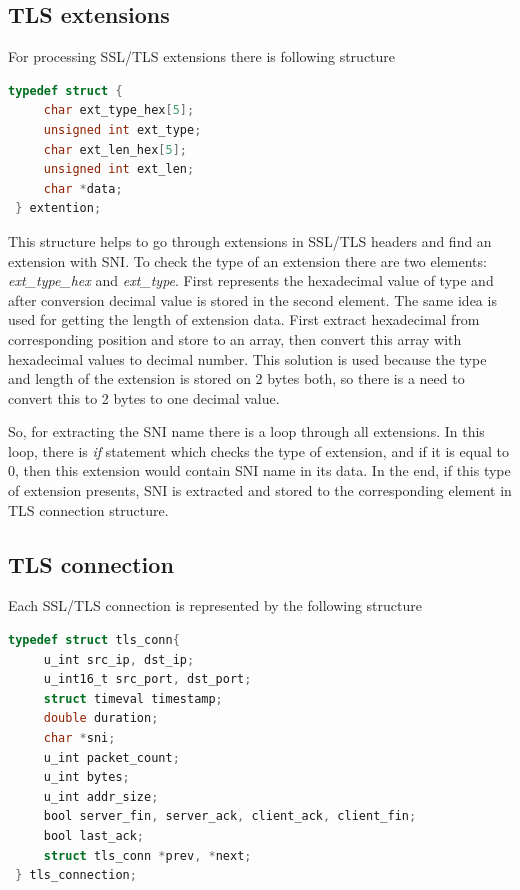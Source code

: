 \documentclass[12pt,a4paper]{article}
\begin{document}
    \subsection{TLS extensions}
    For processing SSL/TLS extensions there is following structure
    \lstset{style=mystyle}
    \begin{lstlisting}[language=C]
 typedef struct {
     char ext_type_hex[5];
     unsigned int ext_type;
     char ext_len_hex[5];
     unsigned int ext_len;
     char *data;
 } extention;
    \end{lstlisting}
     
    This structure helps to go through extensions in SSL/TLS headers and find an 
    extension with SNI. To check the type of an extension there are two elements: 
    \textit{ext\_type\_hex} and \textit{ext\_type}. First represents the 
    hexadecimal value of type and after conversion decimal value is stored in 
    the second element. The same idea is used for getting the length of extension data. 
    First extract hexadecimal from corresponding position and store to an array, 
    then convert this array with hexadecimal values to decimal number. This 
    solution is used because the type and length of the extension is stored on 2 bytes 
    both, so there is a need to convert this to 2 bytes to one decimal value.

    So, for extracting the SNI name there is a loop through all extensions. In this
    loop, there is \textit{if} statement which checks the type of extension, and if it
    is equal to 0, then this extension would contain SNI name in its data. In the
    end, if this type of extension presents, SNI is extracted and stored to the
    corresponding element in TLS connection structure.
    
    \subsection{TLS connection}
    Each SSL/TLS connection is represented by the following structure
    \begin{lstlisting}[language=C]
 typedef struct tls_conn{
     u_int src_ip, dst_ip;
     u_int16_t src_port, dst_port;
     struct timeval timestamp;
     double duration;
     char *sni;
     u_int packet_count;
     u_int bytes;
     u_int addr_size;
     bool server_fin, server_ack, client_ack, client_fin;
     bool last_ack;
     struct tls_conn *prev, *next;
 } tls_connection;
    \end{lstlisting}
\end{document}
